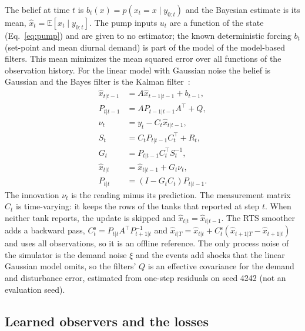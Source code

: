 \documentclass[conference]{IEEEtran}
\begin{document}
The belief at time $t$ is $b_t(x)=p(x_t=x\mid y_{0:t})$ and the Bayesian estimate is its mean, $\hat x_t=\mathbb{E}[x_t\mid y_{0:t}]$. The pump inputs $u_t$ are a function of the state (Eq.~\eqref{eq:pump}) and are given to no estimator; the known deterministic forcing $b_t$ (set-point and mean diurnal demand) is part of the model of the model-based filters. This mean minimizes the mean squared error over all functions of the observation history. For the linear model with Gaussian noise the belief is Gaussian and the Bayes filter is the Kalman filter~\cite{kalman1960}:
\begin{align}
\hat x_{t|t-1}&=A\hat x_{t-1|t-1}+b_{t-1},\label{eq:kf1}\\
P_{t|t-1}&=AP_{t-1|t-1}A^\top+Q,\label{eq:kf1b}\\
\nu_t&=y_t-C_t\hat x_{t|t-1},\label{eq:kf2}\\
S_t&=C_tP_{t|t-1}C_t^\top+R_t,\label{eq:kf2b}\\
G_t&=P_{t|t-1}C_t^\top S_t^{-1},\label{eq:kf3}\\
\hat x_{t|t}&=\hat x_{t|t-1}+G_t\nu_t,\label{eq:kf3b}\\
P_{t|t}&=(I-G_tC_t)P_{t|t-1}.\label{eq:kf4}
\end{align}
The innovation $\nu_t$ is the reading minus its prediction. The measurement matrix $C_t$ is time-varying: it keeps the rows of the tanks that reported at step $t$. When neither tank reports, the update is skipped and $\hat x_{t|t}=\hat x_{t|t-1}$. The RTS smoother~\cite{rts1965} adds a backward pass, $C_t^{\text{s}}=P_{t|t}A^\top P_{t+1|t}^{-1}$ and $\hat x_{t|T}=\hat x_{t|t}+C_t^{\text{s}}(\hat x_{t+1|T}-\hat x_{t+1|t})$ and uses all observations, so it is an offline reference. The only process noise of the simulator is the demand noise $\xi$ and the events add shocks that the linear Gaussian model omits, so the filters' $Q$ is an effective covariance for the demand and disturbance error, estimated from one-step residuals on seed 4242 (not an evaluation seed).

\subsection{Learned observers and the losses}
\end{document}
